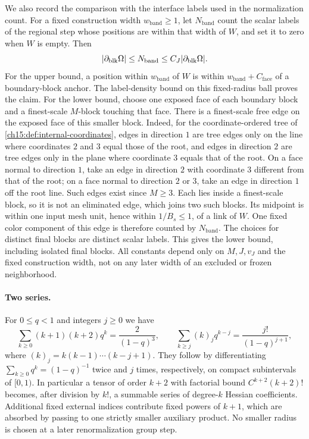 We also record the comparison with the interface labels used in the normalization count. For a fixed construction width $w_{\mathrm{band}}\ge1$, let $N_{\mathrm{band}}$ count the scalar labels of the regional step whose positions are within that width of $W$, and set it to zero when $W$ is empty. Then
\begin{equation}\label{ch17:eq:block-boundary-count}
 \lvert \partial_{\mathrm{blk}}\Omega\rvert\le N_{\mathrm{band}}
       \le C_J\lvert \partial_{\mathrm{blk}}\Omega\rvert.
\end{equation}
For the upper bound, a position within $w_{\mathrm{band}}$ of $W$ is within $w_{\mathrm{band}}+C_{\mathrm{face}}$ of a boundary-block anchor. The label-density bound on this fixed-radius ball proves the claim. For the lower bound, choose one exposed face of each boundary block and a finest-scale $M$-block touching that face. There is a finest-scale free edge on the exposed face of this smaller block. Indeed, for the coordinate-ordered tree of \cref{ch15:def:internal-coordinates}, edges in direction $1$ are tree edges only on the line where coordinates $2$ and $3$ equal those of the root, and edges in direction $2$ are tree edges only in the plane where coordinate $3$ equals that of the root. On a face normal to direction $1$, take an edge in direction $2$ with coordinate $3$ different from that of the root; on a face normal to direction $2$ or $3$, take an edge in direction $1$ off the root line. Such edges exist since $M\ge3$. Each lies inside a finest-scale block, so it is not an eliminated edge, which joins two such blocks. Its midpoint is within one input mesh unit, hence within $1/B_s\le1$, of a link of $W$. One fixed color component of this edge is therefore counted by $N_{\mathrm{band}}$. The choices for distinct final blocks are distinct scalar labels. This gives the lower bound, including isolated final blocks. All constants depend only on $M,J,v_J$ and the fixed construction width, not on any later width of an excluded or frozen neighborhood.

\paragraph{Two series.}
For $0\le q<1$ and integers $j\ge0$ we have
\begin{equation}\label{ch17:eq:factorial-series}
 \sum_{k\ge0}(k+1)(k+2)q^k=\frac2{(1-q)^3},\qquad
 \sum_{k\ge j}(k)_jq^{k-j}=\frac{j!}{(1-q)^{j+1}},
\end{equation}
where $(k)_j=k(k-1)\cdots(k-j+1)$. They follow by differentiating $\sum_{k\ge0}q^k=(1-q)^{-1}$ twice and $j$ times, respectively, on compact subintervals of $[0,1)$. In particular a tensor of order $k+2$ with factorial bound $C^{k+2}(k+2)!$ becomes, after division by $k!$, a summable series of degree-$k$ Hessian coefficients. Additional fixed external indices contribute fixed powers of $k+1$, which are absorbed by passing to one strictly smaller auxiliary product. No smaller radius is chosen at a later renormalization group step.

